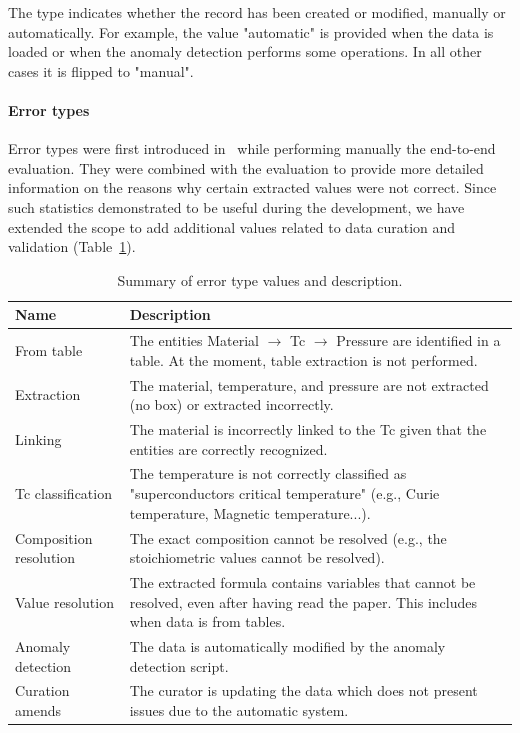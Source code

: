 \documentclass[a4paper]{article}
\begin{document}
The type indicates whether the record has been created or modified, manually or automatically. 
For example, the value "automatic" is provided when the data is loaded or when the anomaly detection performs some operations. In all other cases it is flipped to "manual". 

\paragraph{Error types} Error types were first introduced in~\cite{lfoppiano2023automatic} while performing manually the end-to-end evaluation. They were combined with the evaluation to provide more detailed information on the reasons why certain extracted values were not correct. 
Since such statistics demonstrated to be useful during the development, we have extended the scope to add additional values related to data curation and validation (Table~\ref{tab:error-types}).

\begin{table}[htbp]
\centering
\begin{tabular}{|p{4cm}|p{8cm}|}
\hline
\textbf{Name} & \textbf{Description} \\
\hline
From table & The entities Material $\rightarrow$ Tc $\rightarrow$ Pressure are identified in a table. At the moment, table extraction is not performed. \\
\hline
Extraction & The material, temperature, and pressure are not extracted (no box) or extracted incorrectly. \\
\hline
Linking & The material is incorrectly linked to the Tc given that the entities are correctly recognized. \\
\hline
Tc classification & The temperature is not correctly classified as "superconductors critical temperature" (e.g., Curie temperature, Magnetic temperature...). \\
\hline
Composition resolution & The exact composition cannot be resolved (e.g., the stoichiometric values cannot be resolved). \\
\hline
Value resolution & The extracted formula contains variables that cannot be resolved, even after having read the paper. This includes when data is from tables. \\
\hline
Anomaly detection & The data is automatically modified by the anomaly detection script. \\
\hline
Curation amends & The curator is updating the data which does not present issues due to the automatic system. \\
\hline
\end{tabular}
\caption{Summary of error type values and description.}
\label{tab:error-types}
\end{table}
\end{document}
